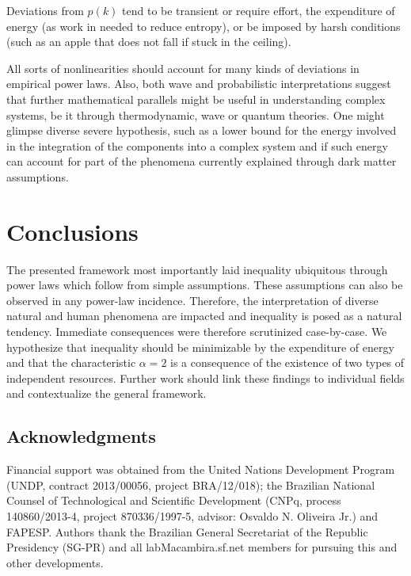 \documentclass[a4paper, 11pt]{article} %
\begin{document}
Deviations from $p(k)$ tend to be transient or require effort, the expenditure of energy (as work in needed to reduce entropy), or be imposed by harsh conditions (such as an apple that does not fall if stuck in the ceiling).

All sorts of nonlinearities should account
for many kinds of deviations in empirical power laws.
Also,
both wave and probabilistic interpretations
suggest that further mathematical
parallels might be useful in understanding complex
systems, be it through thermodynamic, wave or quantum theories.
One might glimpse diverse severe hypothesis,
such as a lower bound for the energy involved in the integration of
the components into a complex system and
if such energy can account for part of the phenomena
currently explained through dark matter assumptions.




\section{Conclusions}
The presented framework 
most importantly laid inequality ubiquitous
through power laws which follow from simple assumptions.
These assumptions can also be observed in any power-law incidence.
Therefore, the interpretation of diverse natural and human phenomena 
are impacted and inequality is posed as a natural tendency.
Immediate consequences were therefore scrutinized case-by-case.
We hypothesize that
inequality should be minimizable by the expenditure of energy
and that the characteristic $\alpha=2$ is a consequence of
the existence of two types of independent resources.
Further work should link these findings to individual fields
and contextualize the general framework.

\subsection*{Acknowledgments}
Financial support was obtained from 
the United Nations Development Program 
(UNDP, contract 2013/00056, project BRA/12/018);
the Brazilian National Counsel of Technological 
and Scientific Development (CNPq, process 140860/2013-4, project 870336/1997-5,
advisor: Osvaldo N. Oliveira Jr.) and FAPESP.
Authors thank
the Brazilian 
General Secretariat of the Republic Presidency (SG-PR) and 
all
labMacambira.sf.net members for pursuing this and other developments.
\end{document}
